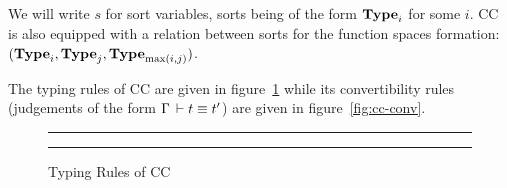 \documentclass[11pt]{article}
\theoremstyle{plain}
\theoremstyle{remark}
\begin{document}
We will write $s$ for sort variables, sorts being of the form $\operatorname{\mathbf{Type}}_i$ for
some $i$. CC is also equipped with a relation between sorts for the function
spaces formation: $(\operatorname{\mathbf{Type}}_i, \operatorname{\mathbf{Type}}_j, \operatorname{\mathbf{Type}}_{\max(i,j)})$.

The typing rules of CC are given in figure~\ref{fig:cc-typ} while its
convertibility rules (judgements of the form $\Gamma \,\vdash t \equiv t'$) are
given in figure~\ref{fig:cc-conv}.

\begin{figure}[h]
  \hrule \vspace*{2ex}%

  \begin{mathc}
    \qquad
    \qquad
  \end{mathc}

  \begin{mathc}
    \qquad
  \end{mathc}

  \begin{mathc}
  \end{mathc}

  \begin{mathc}
    \qquad
  \end{mathc}

  \begin{mathc}
  \end{mathc}

  \hrule%

  \caption{Typing Rules of CC}
  \label{fig:cc-typ}
\end{figure}
\end{document}
